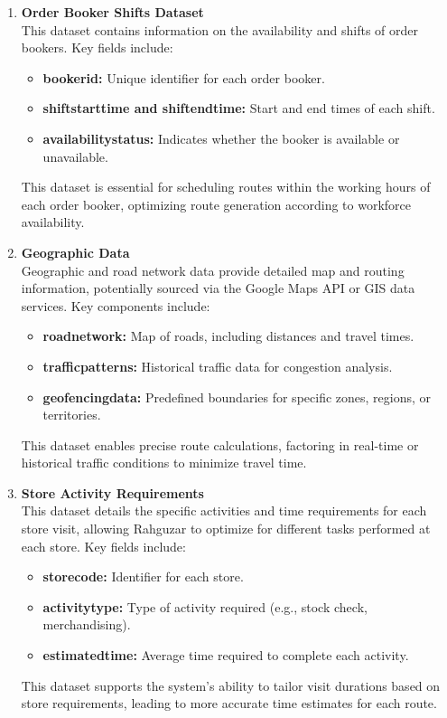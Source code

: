 \begin{enumerate}

\item \textbf{Order Booker Shifts Dataset} \\
This dataset contains information on the availability and shifts of order bookers. Key fields include:
    \begin{itemize}
        \item \textbf{bookerid:} Unique identifier for each order booker.
        \item \textbf{shiftstarttime and shiftendtime:} Start and end times of each shift.
        \item \textbf{availabilitystatus:} Indicates whether the booker is available or unavailable.
    \end{itemize}
This dataset is essential for scheduling routes within the working hours of each order booker, optimizing route generation according to workforce availability.

\item \textbf{Geographic Data} \\
Geographic and road network data provide detailed map and routing information, potentially sourced via the Google Maps API or GIS data services. Key components include:
    \begin{itemize}
        \item \textbf{roadnetwork:} Map of roads, including distances and travel times.
        \item \textbf{trafficpatterns:} Historical traffic data for congestion analysis.
        \item \textbf{geofencingdata:} Predefined boundaries for specific zones, regions, or territories.
    \end{itemize}
This dataset enables precise route calculations, factoring in real-time or historical traffic conditions to minimize travel time.

\item \textbf{Store Activity Requirements} \\
This dataset details the specific activities and time requirements for each store visit, allowing Rahguzar to optimize for different tasks performed at each store. Key fields include:
    \begin{itemize}
        \item \textbf{storecode:} Identifier for each store.
        \item \textbf{activitytype:} Type of activity required (e.g., stock check, merchandising).
        \item \textbf{estimatedtime:} Average time required to complete each activity.
    \end{itemize}
This dataset supports the system’s ability to tailor visit durations based on store requirements, leading to more accurate time estimates for each route.
\end{enumerate}


